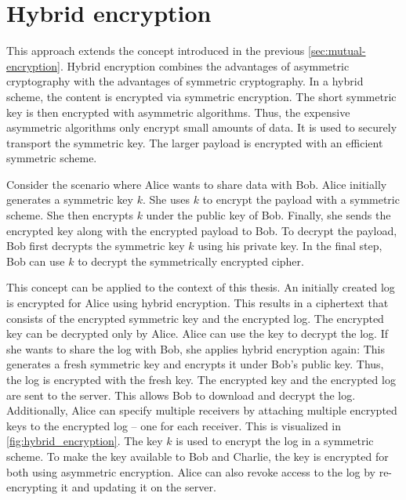 \documentclass[../main.tex]{subfiles}
\begin{document}
\section{Hybrid encryption}
\label{sec:hybrid-encryption}

This approach extends the concept introduced in the previous \cref{sec:mutual-encryption}.
Hybrid encryption combines the advantages of asymmetric cryptography with the advantages of symmetric cryptography.
In a hybrid scheme, the content is encrypted via symmetric encryption.
The short symmetric key is then encrypted with asymmetric algorithms.
Thus, the expensive asymmetric algorithms only encrypt small amounts of data.
It is used to securely transport the symmetric key.
The larger payload is encrypted with an efficient symmetric scheme.
~\cite[340]{Eckert2018}

Consider the scenario where Alice wants to share data with Bob.
Alice initially generates a symmetric key $k$.
She uses $k$ to encrypt the payload with a symmetric scheme.
She then encrypts $k$ under the public key of Bob.
Finally, she sends the encrypted key along with the encrypted payload to Bob.
To decrypt the payload, Bob first decrypts the symmetric key $k$ using his private key.
In the final step, Bob can use $k$ to decrypt the symmetrically encrypted cipher.

This concept can be applied to the context of this thesis.
An initially created log is encrypted for Alice using hybrid encryption.
This results in a ciphertext that consists of the encrypted symmetric key and the encrypted log.
The encrypted key can be decrypted only by Alice.
Alice can use the key to decrypt the log.
If she wants to share the log with Bob, she applies hybrid encryption again:
This generates a fresh symmetric key and encrypts it under Bob's public key.
Thus, the log is encrypted with the fresh key.
The encrypted key and the encrypted log are sent to the server.
This allows Bob to download and decrypt the log.
Additionally, Alice can specify multiple receivers by attaching multiple encrypted keys to the encrypted log -- one for each receiver.
This is visualized in \cref{fig:hybrid_encryption}. 
The key $k$ is used to encrypt the log in a symmetric scheme.
To make the key available to Bob and Charlie, the key is encrypted for both using asymmetric encryption.
Alice can also revoke access to the log by re-encrypting it and updating it on the server. 
\end{document}
